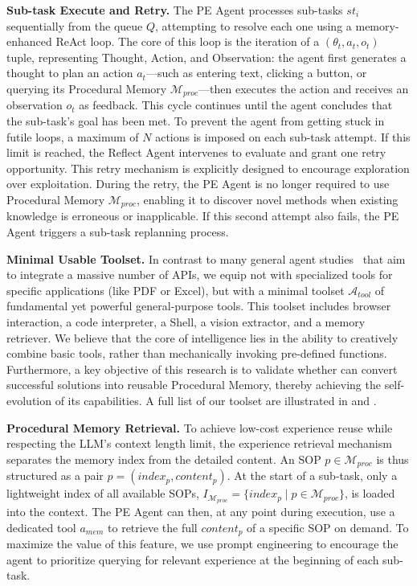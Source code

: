 \textbf{Sub-task Execute and Retry.} The PE Agent processes sub-tasks $st_i$ sequentially from the queue $Q$, attempting to resolve each one using a memory-enhanced ReAct loop. The core of this loop is the iteration of a $(\theta_t, a_t, o_t)$ tuple, representing Thought, Action, and Observation: the agent first generates a thought to plan an action $a_t$—such as entering text, clicking a button, or querying its Procedural Memory $\mathcal{M}_{proc}$—then executes the action and receives an observation $o_t$ as feedback. This cycle continues until the agent concludes that the sub-task's goal has been met.
To prevent the agent from getting stuck in futile loops, a maximum of $N$ actions is imposed on each sub-task attempt. If this limit is reached, the Reflect Agent intervenes to evaluate and grant one retry opportunity. This retry mechanism is explicitly designed to encourage exploration over exploitation. During the retry, the PE Agent is no longer required to use Procedural Memory $\mathcal{M}_{proc}$, enabling it to discover novel methods when existing knowledge is erroneous or inapplicable. If this second attempt also fails, the PE Agent triggers a sub-task replanning process.

\textbf{Minimal Usable Toolset.}
In contrast to many general agent studies~\citep{qin2023toolllm, patil2024gorilla} that aim to integrate a massive number of APIs, we equip {\method} not with specialized tools for specific applications (like PDF or Excel), but with a minimal toolset $\mathcal{A}_{tool}$ of fundamental yet powerful general-purpose tools. This toolset includes browser interaction, a code interpreter, a Shell, a vision extractor, and a memory retriever. We believe that the core of intelligence lies in the ability to creatively combine basic tools, rather than mechanically invoking pre-defined functions. Furthermore, a key objective of this research is to validate whether {\method} can convert successful solutions into reusable Procedural Memory, thereby achieving the self-evolution of its capabilities. A full list of our toolset are illustrated in  and .

\textbf{Procedural Memory Retrieval.}
To achieve low-cost experience reuse while respecting the LLM's context length limit, the experience retrieval mechanism separates the memory index from the detailed content. An SOP $p \in \mathcal{M}_{proc}$ is thus structured as a pair $p = (index_p, content_p)$. At the start of a sub-task, only a lightweight index of all available SOPs, $I_{\mathcal{M}_{proc}} = \{index_p \mid p \in \mathcal{M}_{proc}\}$, is loaded into the context. The PE Agent can then, at any point during execution, use a dedicated tool $a_{mem}$ to retrieve the full $content_p$ of a specific SOP on demand. To maximize the value of this feature, we use prompt engineering to encourage the agent to prioritize querying for relevant experience at the beginning of each sub-task.

